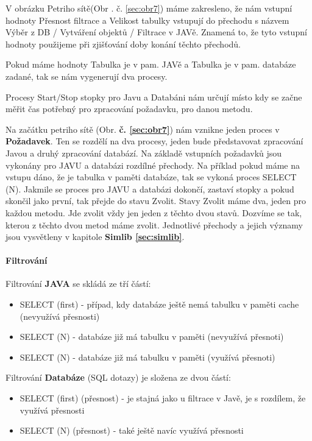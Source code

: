 \documentclass[a4paper, 11pt]{article}
\begin{document}
V obrázku Petriho sítě(Obr . č. \ref{sec:obr7}) máme zakresleno, že nám vstupní hodnoty Přesnost filtrace a Velikost tabulky vstupují do přechodu s názvem Výběr z DB / Vytváření objektů / Filtrace v JAVě. Znamená to, že tyto vstupní hodnoty použijeme při zjišťování doby konání těchto přechodů.

Pokud máme hodnoty Tabulka je v pam. JAVě a Tabulka je v pam. databáze zadané, tak se nám vygenerují dva procesy.

Procesy Start/Stop stopky pro Javu a Databáni nám určují místo kdy se začne měřit čas potřebný pro zpracování požadavku, pro danou metodu.

Na začátku petriho sítě (Obr. \textbf{č. \ref{sec:obr7}}) nám vznikne jeden proces v \textbf{Požadavek}. Ten se rozdělí na dva procesy, jeden bude představovat zpracování Javou a druhý zpracování databází.
Na základě vstupních požadavků jsou vykonány pro JAVU a databázi rozdílné přechody. Na příklad pokud máme na vstupu dáno, že je tabulka v paměti databáze, tak se vykoná proces SELECT (N). Jakmile se proces pro JAVU a databázi dokončí, zastaví stopky a pokud skončil jako první, tak přejde do stavu Zvolit. Stavy Zvolit máme dva, jeden pro každou metodu.  Jde zvolit vždy jen jeden z těchto dvou stavů. Dozvíme se tak, kterou z těchto dvou metod máme zvolit.
Jednotlivé přechody a jejich významy jsou vysvětleny v kapitole \textbf{Simlib \ref{sec:simlib}}.

\paragraph{Filtrování} Filtrování \textbf{JAVA} se skládá ze tří částí:

\begin{itemize}
\item SELECT (first) - případ, kdy databáze ještě nemá tabulku v paměti cache (nevyužívá přesnosti)
\item SELECT (N) - databáze již má tabulku v paměti (nevyužívá přesnoti)
\item SELECT (N) - databáze již má tabulku v paměti (využívá přesnoti)
\end{itemize}


Filtrování \textbf{Databáze} (SQL dotazy) je složena ze dvou částí:

\begin{itemize}
\item SELECT (first) (přesnost) - je stajná jako u filtrace v Javě, je s rozdílem, že využívá přesnosti
\item SELECT (N) (přesnost) - také ještě navíc využívá přesnosti
\end{itemize}
\end{document}

